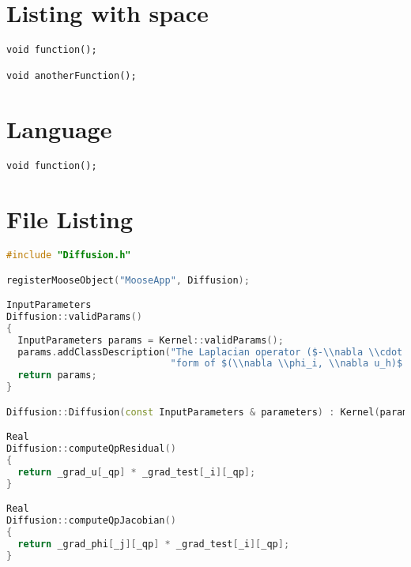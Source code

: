 \section{\label{listing-with-space}Listing with space}
\begin{verbatim}
void function();

void anotherFunction();
\end{verbatim}

\section{\label{language}Language}
\begin{verbatim}
void function();
\end{verbatim}

\section{\label{file-listing}File Listing}
\begin{lstlisting}[language=C++,label=diffusion-c,caption=\mbox{}]
#include "Diffusion.h"

registerMooseObject("MooseApp", Diffusion);

InputParameters
Diffusion::validParams()
{
  InputParameters params = Kernel::validParams();
  params.addClassDescription("The Laplacian operator ($-\\nabla \\cdot \\nabla u$), with the weak "
                             "form of $(\\nabla \\phi_i, \\nabla u_h)$.");
  return params;
}

Diffusion::Diffusion(const InputParameters & parameters) : Kernel(parameters) {}

Real
Diffusion::computeQpResidual()
{
  return _grad_u[_qp] * _grad_test[_i][_qp];
}

Real
Diffusion::computeQpJacobian()
{
  return _grad_phi[_j][_qp] * _grad_test[_i][_qp];
}
\end{lstlisting}

